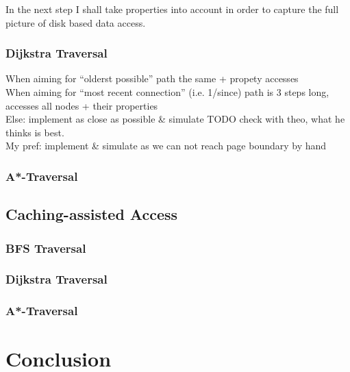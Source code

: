\documentclass[a4paper,10pt]{article}
\begin{document}
            In the next step I shall take properties into account in order to capture the full picture of disk based data access.
            
            
        \subsubsection{Dijkstra Traversal}
            When aiming for "`olderst possible"' path the same + propety accesses \\
            When aiming for "`most recent connection"' (i.e. 1/since) path is 3 steps long, accesses all nodes + their properties \\
            Else: implement as close as possible \& simulate
            TODO check with theo, what he thinks is best. \\
            My pref: implement \& simulate as we can not reach page boundary by hand
            
        \subsubsection{A*-Traversal}


    \subsection{Caching-assisted Access}
        \subsubsection{BFS Traversal}

        \subsubsection{Dijkstra Traversal}

        \subsubsection{A*-Traversal}


\section{Conclusion}
\end{document}
